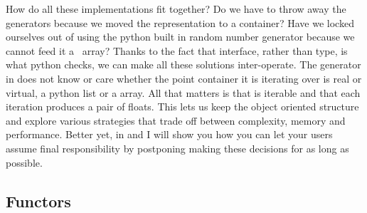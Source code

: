 How do all these implementations fit together? Do we have to throw away the generators because
we moved the representation to a  container? Have we locked ourselves out of
using the python built in random number generator because we cannot feed it a \cc\ array?
Thanks to the fact that interface, rather than type, is what python checks, we can make all
these solutions inter-operate. The generator  in
 does not know or care whether the point container it is
iterating over is real or virtual, a python list or a  array. All that
matters is that  is iterable and that each iteration produces a pair of
floats. This lets us keep the object oriented structure and explore various strategies that
trade off between complexity, memory and performance. Better yet, in  and
 I will show you how you can let your users assume final responsibility by
postponing making these decisions for as long as possible.

\subsection{Functors}
\label{sec:classes:functors}

